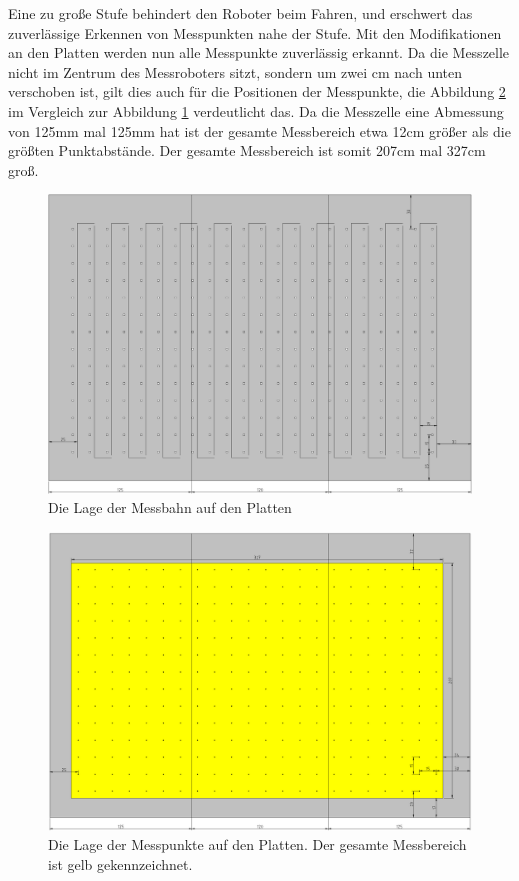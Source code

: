 \documentclass[a4paper,bibtotoc,oneside]{scrbook}
\begin{document}
Eine zu große Stufe behindert den Roboter beim Fahren, und erschwert das zuverlässige Erkennen von Messpunkten nahe der Stufe. Mit den Modifikationen an den Platten werden nun alle Messpunkte zuverlässig erkannt. 
Da die Messzelle nicht im Zentrum des Messroboters sitzt, sondern um zwei cm nach unten verschoben ist, gilt dies auch für die Positionen der Messpunkte, die Abbildung \ref{punkte} im Vergleich zur Abbildung \ref{platten} verdeutlicht das.
Da die Messzelle eine Abmessung von 125mm mal 125mm hat ist der gesamte Messbereich etwa 12cm größer als die größten Punktabstände. Der gesamte Messbereich ist somit 207cm mal 327cm groß.

\begin{figure}[htbp]
\centering
\includegraphics[width=125mm]{img/dreiplatten10.png}
\caption{Die Lage der Messbahn auf den Platten}\label{platten}
\end{figure}

\begin{figure}[htbp]
\centering
\includegraphics[width=125mm]{img/punkte.png}
\caption{Die Lage der Messpunkte auf den Platten. Der gesamte Messbereich ist gelb gekennzeichnet.}\label{punkte}
\end{figure}
\end{document}
